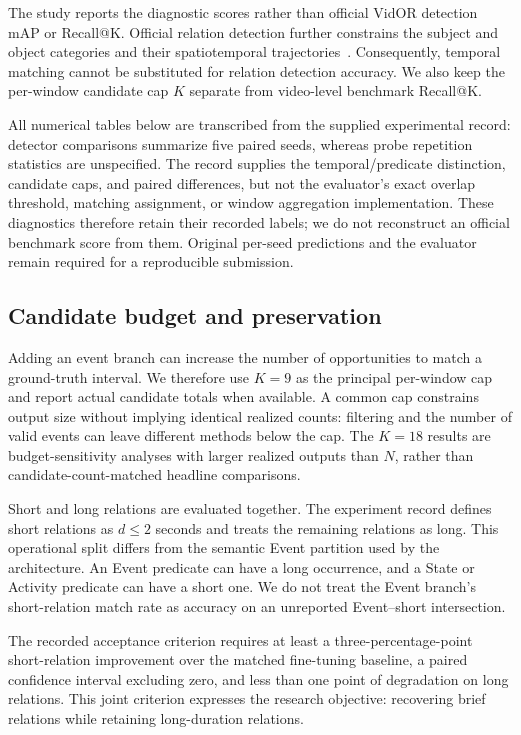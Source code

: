 \documentclass[10pt,twocolumn,letterpaper]{article}
\begin{document}
The study reports the diagnostic scores rather than official VidOR detection mAP or Recall@K. Official relation detection further constrains the subject and object categories and their spatiotemporal trajectories~\cite{shang2017video,jiang2024vrdone}. Consequently, temporal matching cannot be substituted for relation detection accuracy. We also keep the per-window candidate cap $K$ separate from video-level benchmark Recall@K.

All numerical tables below are transcribed from the supplied experimental record: detector comparisons summarize five paired seeds, whereas probe repetition statistics are unspecified. The record supplies the temporal/predicate distinction, candidate caps, and paired differences, but not the evaluator's exact overlap threshold, matching assignment, or window aggregation implementation. These diagnostics therefore retain their recorded labels; we do not reconstruct an official benchmark score from them. Original per-seed predictions and the evaluator remain required for a reproducible submission.

\subsection{Candidate budget and preservation}
Adding an event branch can increase the number of opportunities to match a ground-truth interval. We therefore use $K=9$ as the principal per-window cap and report actual candidate totals when available. A common cap constrains output size without implying identical realized counts: filtering and the number of valid events can leave different methods below the cap. The $K=18$ results are budget-sensitivity analyses with larger realized outputs than $N$, rather than candidate-count-matched headline comparisons.

Short and long relations are evaluated together. The experiment record defines short relations as $d\leq2$ seconds and treats the remaining relations as long. This operational split differs from the semantic Event partition used by the architecture. An Event predicate can have a long occurrence, and a State or Activity predicate can have a short one. We do not treat the Event branch's short-relation match rate as accuracy on an unreported Event--short intersection.

The recorded acceptance criterion requires at least a three-percentage-point short-relation improvement over the matched fine-tuning baseline, a paired confidence interval excluding zero, and less than one point of degradation on long relations. This joint criterion expresses the research objective: recovering brief relations while retaining long-duration relations.
\end{document}

